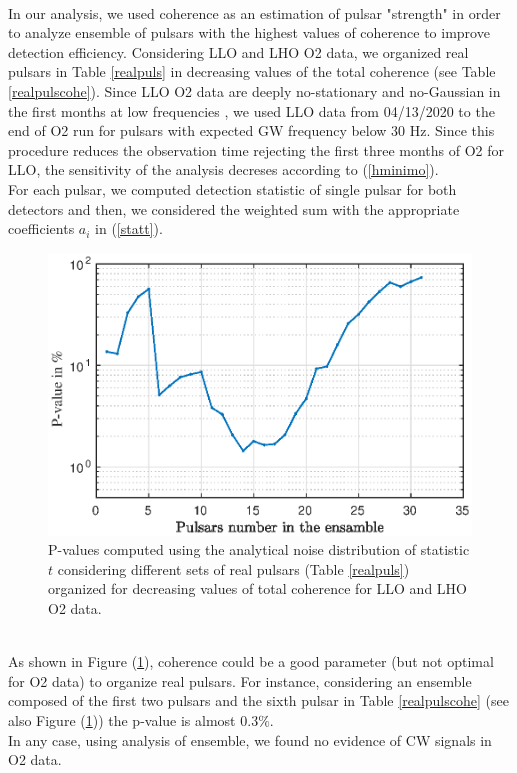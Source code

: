 \documentclass[11pt,a4paper,final]{iopart}
\begin{document}
\\In our analysis, we used coherence as an estimation of pulsar "strength" in order to analyze ensemble of pulsars with the highest values of coherence to improve detection efficiency. Considering LLO and LHO O2 data, we organized real pulsars in Table \ref{realpuls} in decreasing values of the total coherence (see Table \ref{realpulscohe}). Since LLO O2 data are deeply no-stationary and no-Gaussian in the first months at low frequencies \cite{LLO}, we used LLO data from 04/13/2020 to the end of O2 run for pulsars with expected GW frequency below $30$ Hz. Since this procedure reduces the observation time rejecting the first three months of O2 for LLO, the sensitivity of the analysis decreses according to (\ref{hminimo}). 
\\For each pulsar, we computed  detection statistic of single pulsar for both detectors and then, we considered the weighted sum with the appropriate coefficients $a_i$ in (\ref{statt}).
\begin{figure}
\centering
        \includegraphics[clip,trim=0 0 10 0,scale=0.8]{pvalue_31.eps}
    \caption{P-values computed using the analytical noise distribution of statistic $t$ considering different sets of real pulsars (Table \ref{realpuls}) organized for decreasing values of total coherence for LLO and LHO O2 data. } 
    \label{pvalue}
     \vspace{-10pt}
\end{figure}
\\As shown in Figure (\ref{pvalue}), coherence could be a good parameter (but not optimal for O2 data) to organize real pulsars.  For instance, considering an ensemble composed of the first two pulsars and the sixth pulsar in Table \ref{realpulscohe} (see also Figure (\ref{pvalue})) the p-value is almost $0.3\%$. 
\\In any case, using analysis of ensemble, we found no evidence of CW signals in O2 data.
\end{document}
